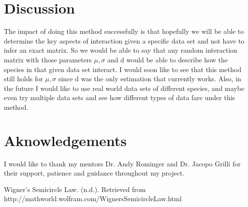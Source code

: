 \documentclass{article}
\newcommand{\D}{\displaystyle}
\begin{document}
\hfill\break
%





\section{Discussion}
The impact of doing this method successfully is that hopefully we will be able to determine the key aspects of interaction given a specific data set and not have to infer an exact matrix. So we would be able to say that any random interaction matrix with those parameters $\mu, \sigma$ and d would be able to describe how the species in that given data set interact. I would soon like to see that this method still holds for $\mu, \sigma$ since d was the only estimation that currently works. Also, in the future I would like to use real world data sets of different species, and maybe even try multiple data sets and see how different types of data fare under this method. 

\hfill\break

\section{Aknowledgements}
I would like to thank my mentors Dr. Andy Rominger and Dr. Jacopo Grilli for their support, patience and guidance throughout my project. 

\begin{thebibliography}{999}

 Wigner's Semicircle Law. (n.d.). Retrieved from http://mathworld.wolfram.com/WignersSemicircleLaw.html


\end{thebibliography}
\end{document}
